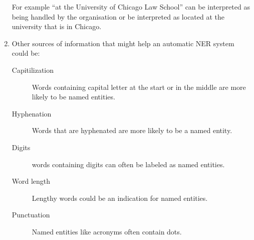 \documentclass[a4paper]{article}
\begin{document}
\begin{enumerate}
        For example ``at the University of Chicago Law School'' can be
        interpreted as being handled by the organisation or be interpreted as
        located at the university that is in Chicago.

    \item Other sources of information that might help an automatic NER system
        could be:

        \begin{description}
            \item[Capitilization] Words containing capital letter at the start
                or in the middle are more likely to be named entities.
            \item[Hyphenation] Words that are hyphenated are more likely to be a
                named entity.
            \item[Digits] words containing digits can often be labeled as named
                entities.
            \item[Word length] Lengthy words could be an indication for named
                entities.
            \item[Punctuation] Named entities like acronyms often contain dots.
        \end{description}

\end{enumerate}
\end{document}
